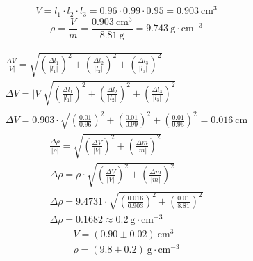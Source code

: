 \documentclass[a4paper]{article}
\newcommand{\unit}[1]{~\mathrm{#1}}
\begin{document}
\begin{equation*}
    V = l_1 \cdot l_2 \cdot l_3 = 0.96 \cdot 0.99 \cdot 0.95 = 0.903\unit{cm^3}
\end{equation*}
\[ \rho = \frac{V}{m} = \frac{0.903\unit{cm^3}}{8.81\unit{g}} = 9.743 \unit{g
\cdot cm^{-3}} \]

\begin{gather*}
    \frac{\Delta V}{|V|} =\sqrt{\left (\frac{\Delta l_1}{|l_1|}\right ) ^ 2 + \left (\frac{\Delta l_2}{|l_2|}\right ) ^ 2 + \left (\frac{\Delta l_3}{|l_3|}\right ) ^ 2} \\ 
    \Delta V = |V| \sqrt{\left (\frac{\Delta l_1}{|l_1|}\right ) ^ 2 + \left (\frac{\Delta l_2}{|l_2|}\right ) ^ 2 + \left (\frac{\Delta l_3}{|l_3|}\right ) ^ 2}\\
    \Delta V = 0.903 \cdot \sqrt{\left (\frac{0.01}{0.96}\right ) ^ 2 + \left (\frac{0.01}{0.99}\right ) ^ 2 + \left (\frac{0.01}{0.95}\right ) ^ 2} =  0.016\unit{cm}
\end{gather*}
\begin{gather*}
    \frac{\Delta \rho}{|\rho|} = \sqrt{\left( \frac{\Delta V}{|V|}\right) ^2 + \left(\frac{\Delta m}{|m|}\right) ^2}\\
    \Delta \rho = \rho \cdot \sqrt{\left( \frac{\Delta V}{|V|}\right) ^2 + \left(\frac{\Delta m}{|m|}\right) ^2}\\
    \Delta \rho = 9.4731 \cdot \sqrt{\left( \frac{0.016}{0.903}\right) ^2 + \left(\frac{0.01}{8.81}\right) ^2}\\
    \Delta \rho =  0.1682 \approx 0.2\unit{g \cdot cm^{-3}}
\end{gather*}
\begin{gather*}
    V = (0.90 \pm 0.02) \unit{cm^3}\\
    \rho = (9.8 \pm 0.2) \unit{g \cdot cm^{-3}}
\end{gather*}
\end{document}
